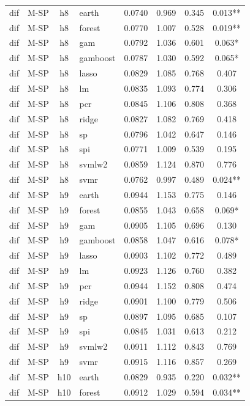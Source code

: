 \begin{ThreePartTable}
\begin{longtable}[t]{llclcccc}
\addlinespace
dif & M-SP & h8 & earth & 0.0740 & 0.969 & 0.345 & 0.013**\\
dif & M-SP & h8 & forest & 0.0770 & 1.007 & 0.528 & 0.019**\\
dif & M-SP & h8 & gam & 0.0792 & 1.036 & 0.601 & 0.063*\\
dif & M-SP & h8 & gamboost & 0.0787 & 1.030 & 0.592 & 0.065*\\
dif & M-SP & h8 & lasso & 0.0829 & 1.085 & 0.768 & 0.407\\
dif & M-SP & h8 & lm & 0.0835 & 1.093 & 0.774 & 0.306\\
dif & M-SP & h8 & pcr & 0.0845 & 1.106 & 0.808 & 0.368\\
dif & M-SP & h8 & ridge & 0.0827 & 1.082 & 0.769 & 0.418\\
dif & M-SP & h8 & sp & 0.0796 & 1.042 & 0.647 & 0.146\\
dif & M-SP & h8 & spi & 0.0771 & 1.009 & 0.539 & 0.195\\
dif & M-SP & h8 & svmlw2 & 0.0859 & 1.124 & 0.870 & 0.776\\
dif & M-SP & h8 & svmr & 0.0762 & 0.997 & 0.489 & 0.024**\\
\addlinespace
dif & M-SP & h9 & earth & 0.0944 & 1.153 & 0.775 & 0.146\\
dif & M-SP & h9 & forest & 0.0855 & 1.043 & 0.658 & 0.069*\\
dif & M-SP & h9 & gam & 0.0905 & 1.105 & 0.696 & 0.130\\
dif & M-SP & h9 & gamboost & 0.0858 & 1.047 & 0.616 & 0.078*\\
dif & M-SP & h9 & lasso & 0.0903 & 1.102 & 0.772 & 0.489\\
dif & M-SP & h9 & lm & 0.0923 & 1.126 & 0.760 & 0.382\\
dif & M-SP & h9 & pcr & 0.0944 & 1.152 & 0.808 & 0.474\\
dif & M-SP & h9 & ridge & 0.0901 & 1.100 & 0.779 & 0.506\\
dif & M-SP & h9 & sp & 0.0897 & 1.095 & 0.685 & 0.107\\
dif & M-SP & h9 & spi & 0.0845 & 1.031 & 0.613 & 0.212\\
dif & M-SP & h9 & svmlw2 & 0.0911 & 1.112 & 0.843 & 0.769\\
dif & M-SP & h9 & svmr & 0.0915 & 1.116 & 0.857 & 0.269\\
\addlinespace
dif & M-SP & h10 & earth & 0.0829 & 0.935 & 0.220 & 0.032**\\
dif & M-SP & h10 & forest & 0.0912 & 1.029 & 0.594 & 0.034**\\

\end{longtable}
\end{ThreePartTable}
